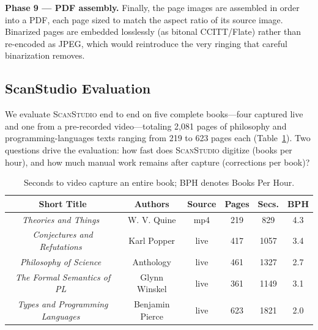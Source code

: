 \documentclass{article}
\newcommand{\sys}{\textsc{ScanStudio}\xspace}
\begin{document}
\noindent\textbf{Phase 9 --- PDF assembly.}
Finally, the page images are assembled in order into a PDF, each page sized to
match the aspect ratio of its source image. Binarized pages are embedded
losslessly (as bitonal CCITT/Flate) rather than re-encoded as JPEG, which would
reintroduce the very ringing that careful binarization removes.

\subsection{ScanStudio Evaluation}
\label{sec:eval}

We evaluate \sys end to end on five complete books---four captured live and one
from a pre-recorded video---totaling 2{,}081 pages of philosophy and
programming-languages texts ranging from 219 to 623 pages each
(Table~\ref{tab:books-per-hour}). Two questions drive the evaluation: how fast does \sys
digitize (books per hour), and how much manual work remains after capture
(corrections per book)?

\begin{table}[t!]
  \centering
  \footnotesize
  \setlength{\tabcolsep}{3pt}
  \begin{tabular}{|c|c|c|c|c|c|}
    \hline
    \textbf{Short Title} & \textbf{Authors} & \textbf{Source} & \textbf{Pages} & \textbf{Secs.} & \textbf{BPH}\\
    \hline\hline
    \emph{Theories and Things}~\cite{quine1981theories} & W. V. Quine & mp4 & 219 & 829 & 4.3\\
    \emph{Conjectures and Refutations}~\cite{popper1963conjectures} & Karl Popper & live & 417 & 1057 & 3.4\\
    \emph{Philosophy of Science}~\cite{shanker2003philosophy} & Anthology & live & 461 & 1327 & 2.7\\
    \emph{The Formal Semantics of PL}~\cite{winskel1993formal} & Glynn Winskel & live & 361 & 1149 & 3.1\\
    \emph{Types and Programming Languages}~\cite{pierce2002types} & Benjamin Pierce & live & 623 & 1821 & 2.0\\
    \hline
  \end{tabular}
  \caption{Seconds to video capture an entire book; BPH denotes Books Per
  Hour.}
  \label{tab:books-per-hour}
\end{table}
\end{document}

